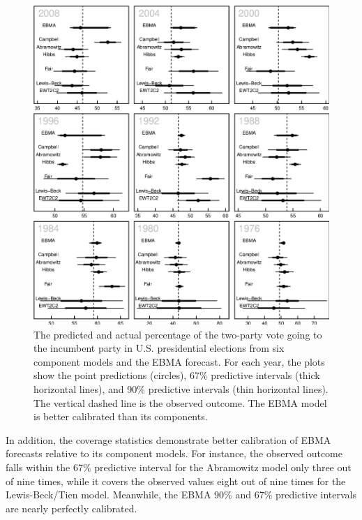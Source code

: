 \documentclass[12pt,fullpage,endnotes]{article}
\begin{document}
 \begin{figure}[h!]
   \caption{\footnotesize The predicted and actual percentage of the
     two-party vote going to the incumbent party in U.S. presidential
     elections from six component models and the EBMA forecast.  For
     each year, the plots show the point predictions (circles), 67\%
     predictive intervals (thick horizontal lines), and 90\%
     predictive intervals (thin horizontal lines).  The vertical
     dashed line is the observed outcome.  The EBMA model is
   better calibrated than its components. }
 \label{PresPlots2}
 \begin{center}
 \includegraphics[width=5.6 in]{PresPlot}
 \end{center}
 \end{figure}
 
 In addition, the coverage statistics demonstrate better calibration
 of EBMA forecasts relative to its component models.  For instance,
 the observed outcome falls within the 67\% predictive interval for
 the Abramowitz model only three out of nine times, while it covers the
 observed values eight out of nine times for the Lewis-Beck/Tien
 model.  Meanwhile, the EBMA 90\% and 67\% predictive intervals are
 nearly perfectly calibrated.
\end{document}
